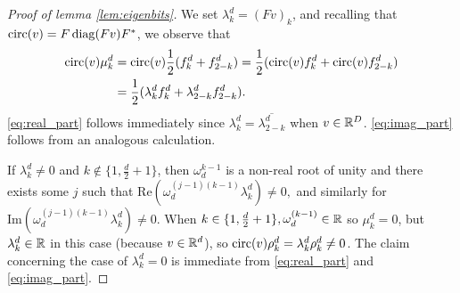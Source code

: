 \begin{proof}[Proof of lemma \ref{lem:eigenbits}]
  We set $\lambda_k^d = (Fv)_k$, and recalling that $\operatorname{circ}(v) = F \operatorname{diag}(F v) F^*$, we observe that \begin{align*}\operatorname{circ}(v) \mu_k^d &= \operatorname{circ}(v) \frac{1}{2} (f_k^d + f_{2 - k}^d) = \frac{1}{2}(\operatorname{circ}(v) f_k^d + \operatorname{circ}(v) f_{2 - k}^d) \\ &= \frac{1}{2}(\lambda_k^d f_k^d + \lambda_{2 - k}^d f_{2 - k}^d).\end{align*}  \eqref{eq:real_part} follows immediately since $\lambda_k^d = \overline{\lambda_{2 - k}^d}$ when $v \in \mathbb{R}^D$.  \eqref{eq:imag_part} follows from an analogous calculation.

  If $\lambda_k^d \neq 0$ and $k \notin \{1, \frac{d}{2} + 1\}$, then $\omega_d^{k - 1}$ is a non-real root of unity and there exists some $j$ such that $\mathrm{Re}(\omega_d^{(j - 1)(k - 1)} \lambda_k^d) \neq 0,$ and similarly for $\mathrm{Im}(\omega_d^{(j - 1)(k - 1)} \lambda_k^d) \neq 0.$  When $k \in \{1, \frac{d}{2} + 1\}, \omega_d^{(k - 1)} \in \mathbb{R}$ so $\mu_k^d = 0$, but $\lambda_k^d \in \mathbb{R}$ in this case (because $v \in \mathbb{R}^d$), so $\operatorname{circ}(v) \rho_k^d = \lambda_k^d \rho_k^d \neq 0$.  The claim concerning the case of $\lambda_k^d = 0$ is immediate from \eqref{eq:real_part} and \eqref{eq:imag_part}.
\end{proof}

